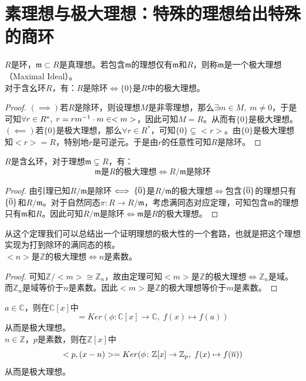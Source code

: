 \section{素理想与极大理想：特殊的理想给出特殊的商环}
$R$是环，$\mathfrak{m}\subset R$是真理想。若包含$\mathfrak{m}$的理想仅有$\mathfrak{m}$和$R$，则称$\mathfrak{m}$是一个极大理想（Maximal Ideal）。\\
\indent {}对于含幺环$R$，有：$R$是除环$\iff\{0\}$是$R$中的极大理想。
\begin{proof}
$(\implies)$若$R$是除环，则设理想$M$是非零理想，那么$\exists m\in M,\; m\neq 0$，于是可知$\forall r\in R^*,\; r=r{m}^{-1}\cdot m\in <m>$，因此可知$M=R$。从而有$\{0\}$是极大理想。\\
$(\impliedby)$若$\{0\}$是极大理想，那么$\forall r\in R^*$，可知$\{0\}\subsetneq <r>$。由$\{0\}$是极大理想知$<r>=R$，特别地$r$是可逆元。于是由$r$的任意性可知$R$是除环。
\end{proof}
$R$是含幺环，对于理想$\mathfrak{m}\subsetneq R$，有：
\[
\mathfrak{m}\text{是}R\text{的极大理想}\iff R/\mathfrak{m}\text{是除环}
\]
\begin{proof}
由引理已知$R/\mathfrak{m}$是除环$\iff\{\overline{0}\}$是$R/\mathfrak{m}$的极大理想$\iff$包含$\{\overline{0}\}$的理想只有$\{\overline{0}\}$和$R/\mathfrak{m}$。对于自然同态$\pi\colon R\to R/\mathfrak{m}$，考虑满同态对应定理，可知包含$\mathfrak{m}$的理想只有$\mathfrak{m}$和$R$。因此可知$R/\mathfrak{m}$是除环$\iff\mathfrak{m}$是$R$的极大理想。
\end{proof}
从这个定理我们可以总结出一个证明理想的极大性的一个套路，也就是把这个理想实现为打到除环的满同态的核。\\
$<n>$是$\mathbb{Z}$的极大理想$\iff n$是素数。
\begin{proof}
可知$\mathbb{Z}/<m>\cong \mathbb{Z}_n$，故由定理可知$<m>$是$\mathbb{Z}$的极大理想$\iff\mathbb{Z}_n$是域。而$\mathbb{Z}_n$是域等价于$n$是素数。因此$<m>$是$\mathbb{Z}$的极大理想等价于$m$是素数。
\end{proof}
\indent {}$a\in \mathbb{C}$，则在$\mathbb{C}[x]$中\[<x-a>=Ker(\phi\colon \mathbb{C}[x]\to \mathbb{C},\; f(x)\mapsto f(a) )\]
从而是极大理想。\\
\indent {}$n\in \mathbb{Z}$，$p$是素数，则在$\mathbb{Z}[x]$中
\[
<p,(x-n)>=Ker(\phi\colon \mathbb{Z}[x]\to \mathbb{Z}_p,\; f(x)\mapsto f(\overline{n}) )
\]
从而是极大理想。

